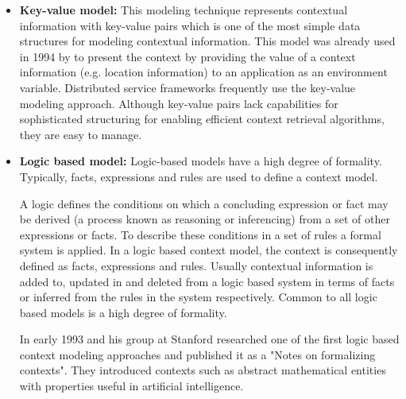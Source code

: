 \begin{itemize}
\item \textbf{Key-value model:}  This modeling technique represents contextual information with key-value pairs which is one of the most simple data structures for modeling contextual information. This model was already used in 1994 by \citeauthor{ieee512740} to present the context by providing the value of a context information (e.g. location information) to an application as an environment variable. Distributed service frameworks  frequently use the key-value modeling approach. Although key-value pairs lack capabilities for sophisticated structuring for enabling efficient context retrieval algorithms, they are easy to manage.

\item \textbf{Logic based model: } %
Logic-based models have a high degree of formality. Typically, facts, expressions and rules are used to define a context model. \cite{BaldaufDustdarRosenberg07ijahuc}





A logic defines the conditions on which a concluding expression or fact may be derived (a process known as reasoning or inferencing) from a set of other expressions or facts. To describe these conditions in a set of rules a formal system is applied. In a logic based context model, the context is consequently defined as facts, expressions and rules. Usually contextual information is added to, updated in and deleted from a logic based system in terms of facts or inferred from the rules in the system respectively. Common to all logic based models is a high degree of formality.\cite{Strang2004}

In early 1993 \citeauthor{McCarthy1993Notes} and his group at Stanford researched one of the first logic based context modeling approaches and published it as a "Notes on formalizing contexts". They introduced contexts such as abstract mathematical entities with properties useful in artificial intelligence.



\end{itemize}
